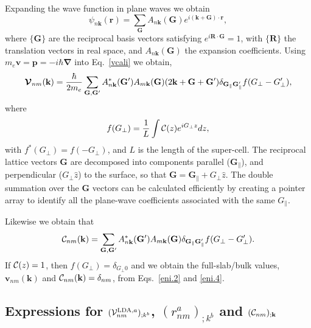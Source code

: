 \documentclass[floatfix,prb,aps,superscriptaddress,showpacs,11pt,preprint,letterpaper]{revtex4}
\begin{document}
Expanding the wave function in plane waves we obtain
\begin{equation*}
\psi_{n\mathbf{k}}(\mathbf{r})=\sum_\mathbf{G} A_{n\mathbf{k}}(\mathbf{G})e^{i(\mathbf{k}+\mathbf{G})\cdot\mathbf{r}}
,
\end{equation*}
where $\{\mathbf{G}\}$ are the reciprocal basis vectors satisfying
$e^{i\mathbf{R}\cdot\mathbf{G}}=1$, with $\{\mathbf{R}\}$ the translation vectors in real
space, and $A_{n\mathbf{k}}(\mathbf{G})$ the expansion coefficients. Using
$m_e\mathbf{v}=\mathbf{p}=-i\hbar\boldsymbol{\nabla}$ into 
Eq.~\eqref{vcali}
we obtain,\cite{mendozaPRB06}
\begin{equation}
\boldsymbol{\mathcal{\cal V}}_{nm}(\mathbf{k})=
\frac{\hbar}{2m_e}
\sum_{\mathbf{G},\mathbf{G}'} A^*_{n\mathbf{k}}(\mathbf{G}')  A_{m\mathbf{k}}(\mathbf{G})
(2\mathbf{k}+\mathbf{G}+\mathbf{G}')
\delta_{\mathbf{G}_\parallel \mathbf{G}'_\parallel}  
f(G_\perp-G'_\perp)
,
\label{eni.2}
\end{equation}   
where
\begin{equation*}
f(G_\perp)=\frac{1}{L}\int{\mathbf{\cal C}}(z) e^{iG_\perp z}dz,
\end{equation*}
with $f^*(G_\perp)=f(-G_\perp)$,
and $L$
is the length of the super-cell. 
The reciprocal lattice vectors $\mathbf{G}$ are 
decomposed into components
parallel ($\mathbf{G}_\parallel$), and perpendicular ($G_\perp \hat z$)
to the surface, so
that $\mathbf{G} = \mathbf{G}_\parallel + G_\perp\hat z$.
The double summation over the $\mathbf{G}$ vectors can be 
calculated efficiently by  
creating a pointer array to identify all the plane-wave coefficients  
associated with the same $G_\parallel$.  

Likewise we obtain that
\begin{equation}
{\mathbf{\cal C}}_{nm}(\mathbf{k})=
\sum_{\mathbf{G},\mathbf{G}'} A^*_{n\mathbf{k}}(\mathbf{G}')  A_{m\mathbf{k}}(\mathbf{G})
\delta_{\mathbf{G}_\parallel \mathbf{G}'_\parallel} 
f(G_\perp-G'_\perp)
.
\label{eni.4}
\end{equation}  
If ${\mathbf{\cal C}}(z)=1$, then $f(G_\perp)=\delta_{G_\perp 0}$ and we 
obtain the full-slab/bulk values, 
$\mathbf{v}_{nm}(\mathbf{k})$ and ${\mathbf{\cal C}}_{nm}(\mathbf{k})=\delta_{nm}$,
from Eqs.~\eqref{eni.2} and \eqref{eni.4}.

\subsection{Expressions for 
\texorpdfstring{$({\mathbf{\cal V}}^{\mathrm{LDA},a}_{nm})_{;k^b}$}{Vnonlocal},
\texorpdfstring{$(r^a_{nm})_{;k^b}$}{Vnonlocal}
and \texorpdfstring{$({\mathbf{\cal C}}_{nm})_{;\mathbf{k}}$}{Vnonlocal}
}\label{appvnl}
\end{document}
